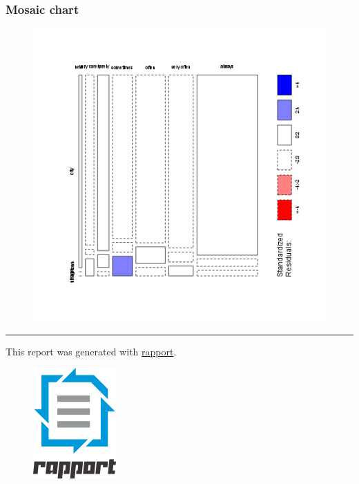 \documentclass[]{article}
\makeatletter
\def\maxwidth{\ifdim\Gin@nat@width>\linewidth\linewidth
\else\Gin@nat@width\fi}
\let\Oldincludegraphics\includegraphics
\renewcommand{\includegraphics}[1]{\Oldincludegraphics[width=\maxwidth]{#1}}
\makeatother
\begin{document}
\subsubsection{Mosaic chart}

\begin{figure}[htbp]
\centering
\includegraphics{b945f6de1aad4225593b3e9c0eb6d7dc.png}
\caption{}
\end{figure}

\begin{center}\rule{3in}{0.4pt}\end{center}

This report was generated with
\href{http://rapport-package.info/}{rapport}.

\begin{figure}[htbp]
\centering
\includegraphics{images/rapport.png}
\caption{}
\end{figure}
\end{document}

